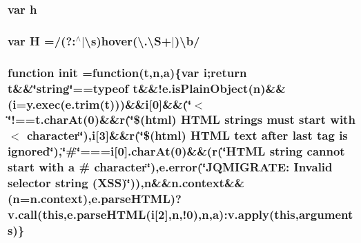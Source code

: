 \subsubsection[{h}]{\setlength{\rightskip}{0pt plus 5cm}var h}\label{jquery-migrate-1_82_81_8min_8js_a79fe0eb780a2a4b5543b4dddf8b6188a}
\hypertarget{jquery-migrate-1_82_81_8min_8js_abd057520df7a5dc64fe29b4edd3166a3}{}
\subsubsection[{H}]{\setlength{\rightskip}{0pt plus 5cm}var H =/(?\+:$^\wedge$$\vert$\textbackslash{}{\bf s})hover(\textbackslash{}.\textbackslash{}{\bf S}+$\vert$)\textbackslash{}{\bf b}/}\label{jquery-migrate-1_82_81_8min_8js_abd057520df7a5dc64fe29b4edd3166a3}
\hypertarget{jquery-migrate-1_82_81_8min_8js_afad5c44fd9c2e2b357d1d9fe069a5881}{}
\subsubsection[{init}]{\setlength{\rightskip}{0pt plus 5cm}function init =function({\bf t},{\bf n},{\bf a})\{var {\bf i};return {\bf t}\&\&\char`\"{}string\char`\"{}==typeof {\bf t}\&\&!e.\+is\+Plain\+Object({\bf n})\&\&({\bf i}=y.\+exec(e.\+trim({\bf t})))\&\&{\bf i}\mbox{[}0\mbox{]}\&\&(\char`\"{}$<$\char`\"{}!==t.\+char\+At(0)\&\&{\bf r}(\char`\"{}\$(html) H\+T\+M\+L strings must start with \textquotesingle{}$<$\textquotesingle{} character\char`\"{}),i\mbox{[}3\mbox{]}\&\&{\bf r}(\char`\"{}\$(html) H\+T\+M\+L {\bf text} after {\bf last} tag is ignored\char`\"{}),\char`\"{}\#\char`\"{}===i\mbox{[}0\mbox{]}.char\+At(0)\&\&({\bf r}(\char`\"{}H\+T\+M\+L string cannot start with {\bf a} \textquotesingle{}\#\textquotesingle{} character\char`\"{}),e.\+error(\char`\"{}J\+Q\+M\+I\+G\+R\+A\+T\+E\+: Invalid selector string (X\+S\+S)\char`\"{})),n\&\&n.\+context\&\&({\bf n}=n.\+context),e.\+parse\+H\+T\+M\+L)?{\bf v.\+call}({\bf this},e.\+parse\+H\+T\+M\+L({\bf i}\mbox{[}2\mbox{]},{\bf n},!0),{\bf n},{\bf a})\+:v.\+apply({\bf this},arguments)\}}\label{jquery-migrate-1_82_81_8min_8js_afad5c44fd9c2e2b357d1d9fe069a5881}
\hypertarget{jquery-migrate-1_82_81_8min_8js_aab858032a95af802114b255fac6f45f2}{}
